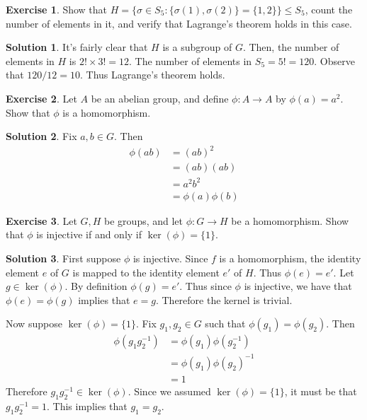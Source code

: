 \documentclass[12pt]{article}
\theoremstyle{definition}
\newtheorem{exercise}{\color{YellowOrange}Exercise}
\theoremstyle{definition}
\newtheorem{solution}{\color{Goldenrod}Solution}
\begin{document}
\begin{exercise}
Show that $H = \{\sigma \in S_5 : \{\sigma(1), \sigma(2) \} = \{1,2\} \} \leq S_5$, count the number of elements in it, and verify that Lagrange's theorem holds in this case.
\end{exercise}
\begin{solution}
It's fairly clear that $H$ is a subgroup of $G$. Then, the number of elements in $H$ is $2! \times 3! = 12$. The number of elements in $S_5 = 5! = 120$. Observe that $120 / 12 = 10$. Thus Lagrange's theorem holds. 
\end{solution}

\begin{exercise}
Let $A$ be an abelian group, and define $\phi : A \to A$ by $\phi(a) = a^2$. Show that $\phi$ is a homomorphism. 
\end{exercise}
\begin{solution}
Fix $a,b \in G$. Then
\begin{align*}
\phi(ab) &= (ab)^2 \\
&= (ab) (ab) \\
&= a^2 b^2 \tag{since $A$ is abelian} \\
&= \phi(a) \phi(b)
\end{align*}
\end{solution}

\begin{exercise}
Let $G, H$ be groups, and let $\phi : G \to H$ be a homomorphism. Show that $\phi$ is injective if and only if $\ker(\phi) = \{1\}$.
\end{exercise}
\begin{solution}
First suppose $\phi$ is injective. Since $f$ is a homomorphism, the identity element $e$ of $G$ is mapped to the identity element $e'$ of $H$. Thus $\phi(e) = e'$. Let $g \in \ker(\phi)$. By definition $\phi(g) = e'$. Thus since $\phi$ is injective, we have that $\phi(e) = \phi(g)$ implies that $e = g$. Therefore the kernel is trivial.

Now suppose $\ker(\phi) = \{1\}$. Fix $g_1, g_2 \in G$ such that $\phi(g_1) = \phi(g_2)$. Then
\begin{align*}
\phi(g_1 g_2^{-1}) &= \phi(g_1) \phi(g_2^{-1}) \tag{$\phi$ is a homomorphism}\\
&= \phi(g_1) \phi(g_2)^{-1} \tag{property of homomorphism} \\
&= 1
\end{align*} 
Therefore $g_1 g_2^{-1} \in \ker(\phi)$. Since we assumed $\ker(\phi) = \{1\}$, it must be that $g_1 g_2^{-1} = 1$. This implies that $g_1 = g_2$.
\end{solution}
\end{document}
